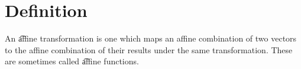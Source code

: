 

\section*{Definition}

An \t{affine transformation} is one which maps an affine combination of two vectors to the affine combination of their results under the same transformation.
These are sometimes called \t{affine functions}.

\blankpage